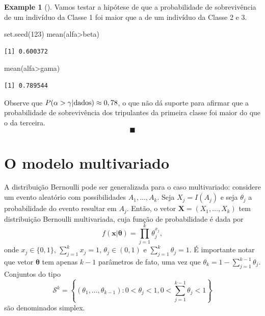 \documentclass[
  letterpaper,
  DIV=11,
  numbers=noendperiod]{scrreprt}
\newenvironment{Shaded}{\begin{snugshade}}{\end{snugshade}}
\newcommand{\DecValTok}[1]{\textcolor[rgb]{0.68,0.00,0.00}{#1}}
\newcommand{\FunctionTok}[1]{\textcolor[rgb]{0.28,0.35,0.67}{#1}}
\newcommand{\NormalTok}[1]{\textcolor[rgb]{0.00,0.23,0.31}{#1}}
\newcommand{\SpecialCharTok}[1]{\textcolor[rgb]{0.37,0.37,0.37}{#1}}
\theoremstyle{definition}
\newtheorem{example}{Example}[chapter]
\theoremstyle{definition}
\theoremstyle{plain}
\theoremstyle{remark}
\begin{document}
\begin{example}[]
Vamos testar a hipótese de que a probabilidade de sobrevivência de um
indivíduo da Classe 1 foi maior que a de um indivíduo da Classe 2 e 3.

\begin{Shaded}
\begin{Highlighting}[]
\FunctionTok{set.seed}\NormalTok{(}\DecValTok{123}\NormalTok{)}
\FunctionTok{mean}\NormalTok{(alfa}\SpecialCharTok{\textgreater{}}\NormalTok{beta)}
\end{Highlighting}
\end{Shaded}

\begin{verbatim}
[1] 0.600372
\end{verbatim}

\begin{Shaded}
\begin{Highlighting}[]
\FunctionTok{mean}\NormalTok{(alfa}\SpecialCharTok{\textgreater{}}\NormalTok{gama)}
\end{Highlighting}
\end{Shaded}

\begin{verbatim}
[1] 0.789544
\end{verbatim}

Observe que \(P(\alpha>\gamma|\hbox{dados})\approx 0,78\), o que não dá
suporte para afirmar que a probabilidade de sobrevivência dos
tripulantes da primeira classe foi maior do que o da terceira.
\[\blacksquare\]

\end{example}

\section{O modelo multivariado}\label{o-modelo-multivariado}

A distribuição Bernoulli pode ser generalizada para o caso multivariado:
considere um evento aleatório com possibilidades \(A_1,\ldots,A_k\).
Seja \(X_j=I(A_j)\) e seja \(\theta_j\) a probabilidade do evento
resultar em \(A_j\). Então, o vetor \(\boldsymbol{X}=(X_1,\ldots,X_k)\)
tem distribuição Bernoulli multivariada, cuja função de probabilidade é
dada por
\[f(\boldsymbol{x}|\boldsymbol{\theta})=\prod_{j=1}^k\theta_j^{x_{j}},\]
onde \(x_j\in\{0,1\}\), \(\sum_{j=1}^kx_j=1\), \(\theta_j\in(0,1)\) e
\(\sum_{j=1}^k\theta_j=1\). É importante notar que vetor
\(\boldsymbol{\theta}\) tem apenas \(k-1\) parâmetros de fato, uma vez
que \(\theta_k=1-\sum_{j=1}^{k-1}\theta_j\). Conjuntos do tipo
\[\mathcal{S}^k=\left\{(\theta_1,\ldots,\theta_{k-1}):0<\theta_j<1,0<\sum_{j=1}^{k-1}\theta_j<1\right\}\]
são denominados simplex.
\end{document}
